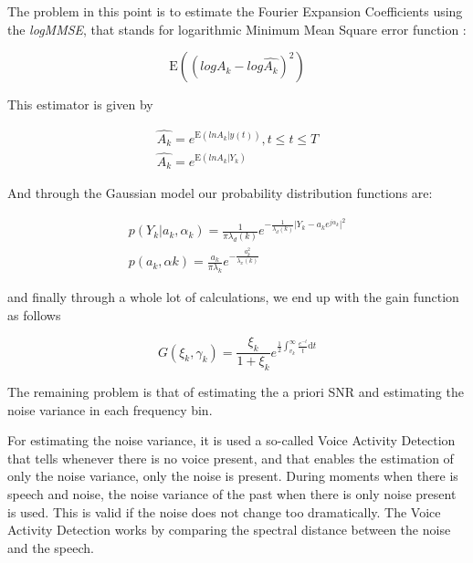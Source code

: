 \documentclass[11pt,a4paper,english]{book}  %
\theoremstyle{definition}  %
\theoremstyle{plain}  %
\theoremstyle{remark}  %
\begin{document}
The problem in this point is to estimate the Fourier Expansion Coefficients using the \textit{logMMSE}, that stands for logarithmic Minimum Mean Square error function \cite{logmmse}:


	\begin{equation}
	\label{eq:logmmse1}
		\mathrm{E}((log A_{k }- log\hat{A_{k}})^2)
	\end{equation}
	
	This estimator is given by
	
	\begin{subequations}
	\label{eq:logmmse2}
	\begin{align}
		\hat{A_{k}}=e^{\mathrm{E}(ln A_{k}\vert y(t))}, t \leq t \leq T\\
		\hat{A_{k}}=e^{\mathrm{E}(ln A_{k}\vert Y_{k})}
		\end{align}
	\end{subequations}
	
	And through the Gaussian model our probability distribution functions are:
	
		\begin{subequations}
	\label{eq:logmmse2}
	\begin{align}
		p(Y_{k} \vert a_{k},\alpha_{k})=\frac{1}{\pi \lambda_{d}(k)} e^{-\frac{1}{\lambda_{d}(k)} \vert Y_{k}-a_{k} e^{j\alpha_{k}}\vert ^2} \\
		p(a_{k}, \alpha{k})=\frac{a_{k}}{\pi \lambda_{k}}e^{-\frac{a_{k}^2}{\lambda_{x}(k)}}
		\end{align}
	\end{subequations}
	
	and finally through a whole lot of calculations, we end up with the gain function as follows
	
	
		\begin{equation}
	\label{eq:logmmse3}
		G(\xi_{k},\gamma_{k})=\frac{\xi_{k}}{1+ \xi_{k}} e^{\frac{1}{2} \int_{v_{k}}^\infty \frac{e^{-t}}{t} \mathrm{d}t}
	\end{equation}
	
	The remaining problem is that of estimating the a priori SNR and estimating the noise variance in each frequency bin.
	
For estimating the noise variance, it is used a so-called Voice Activity Detection that tells whenever there is no voice present, and that enables the estimation of only the noise variance, only the noise is present. During moments when there is speech and noise, the noise variance of the past when there is only noise present is used. This is valid if the noise does not change too dramatically. The Voice Activity Detection works by comparing the spectral distance between the noise and the speech.
\end{document}

